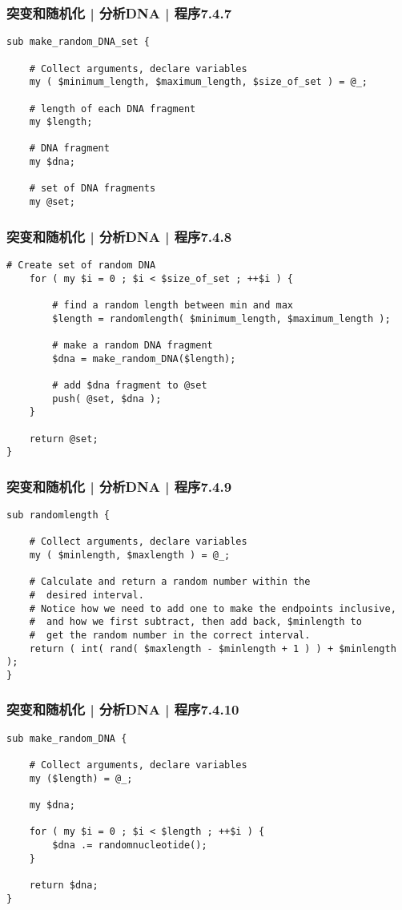 \begin{frame}[fragile]
  \frametitle{突变和随机化 | 分析DNA | 程序7.4.7}
\begin{lstlisting}[firstnumber=89]
sub make_random_DNA_set {

    # Collect arguments, declare variables
    my ( $minimum_length, $maximum_length, $size_of_set ) = @_;

    # length of each DNA fragment
    my $length;

    # DNA fragment
    my $dna;

    # set of DNA fragments
    my @set;
\end{lstlisting}
\end{frame}

\begin{frame}[fragile]
  \frametitle{突变和随机化 | 分析DNA | 程序7.4.8}
\begin{lstlisting}[firstnumber=103,basicstyle=\small\tt]
    # Create set of random DNA
    for ( my $i = 0 ; $i < $size_of_set ; ++$i ) {

        # find a random length between min and max
        $length = randomlength( $minimum_length, $maximum_length );

        # make a random DNA fragment
        $dna = make_random_DNA($length);

        # add $dna fragment to @set
        push( @set, $dna );
    }

    return @set;
}
\end{lstlisting}
\end{frame}

\begin{frame}[fragile]
  \frametitle{突变和随机化 | 分析DNA | 程序7.4.9}
\begin{lstlisting}[firstnumber=127,basicstyle=\small\tt]
sub randomlength {

    # Collect arguments, declare variables
    my ( $minlength, $maxlength ) = @_;

    # Calculate and return a random number within the
    #  desired interval.
    # Notice how we need to add one to make the endpoints inclusive,
    #  and how we first subtract, then add back, $minlength to
    #  get the random number in the correct interval.
    return ( int( rand( $maxlength - $minlength + 1 ) ) + $minlength );
}
\end{lstlisting}
\end{frame}

\begin{frame}[fragile]
  \frametitle{突变和随机化 | 分析DNA | 程序7.4.10}
\begin{lstlisting}[firstnumber=147]
sub make_random_DNA {

    # Collect arguments, declare variables
    my ($length) = @_;

    my $dna;

    for ( my $i = 0 ; $i < $length ; ++$i ) {
        $dna .= randomnucleotide();
    }

    return $dna;
}
\end{lstlisting}
\end{frame}


